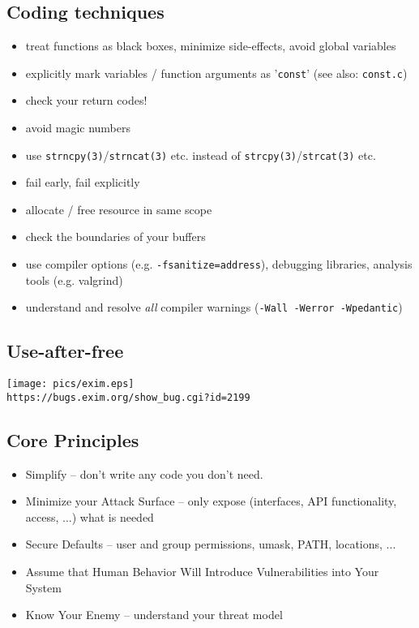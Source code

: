 \documentclass[xga]{xdvislides}
\begin{document}
\subsection{Coding techniques}
\begin{itemize}
	\item treat functions as black boxes, minimize side-effects, avoid global variables
	\item explicitly mark variables / function arguments as '\verb+const+' (see also: \verb+const.c+)
	\item check your return codes!
	\item avoid magic numbers
	\item use \verb+strncpy(3)+/\verb+strncat(3)+ etc. instead of \verb+strcpy(3)+/\verb+strcat(3)+ etc.
	\item fail early, fail explicitly
	\item allocate / free resource in same scope
	\item check the boundaries of your buffers
	\item use compiler options (e.g. \verb+-fsanitize=address+), debugging libraries, analysis tools (e.g. valgrind)
	\item understand and resolve {\em all} compiler warnings (\verb+-Wall -Werror -Wpedantic+)
\end{itemize}

\subsection{Use-after-free}
\begin{center}
        \texttt{[image: pics/exim.eps]} \\
	\verb+https://bugs.exim.org/show_bug.cgi?id=2199+
\end{center}

\subsection{Core Principles}

\begin{itemize}
	\item Simplify -- don't write any code you don't need.
	\item Minimize your Attack Surface -- only expose (interfaces, API functionality, access, ...) what is needed
	\item Secure Defaults -- user and group permissions,
		umask, PATH, locations, ...
	\item Assume that Human Behavior Will Introduce Vulnerabilities into Your System
	\item Know Your Enemy -- understand your threat model
\end{itemize}
\end{document}
